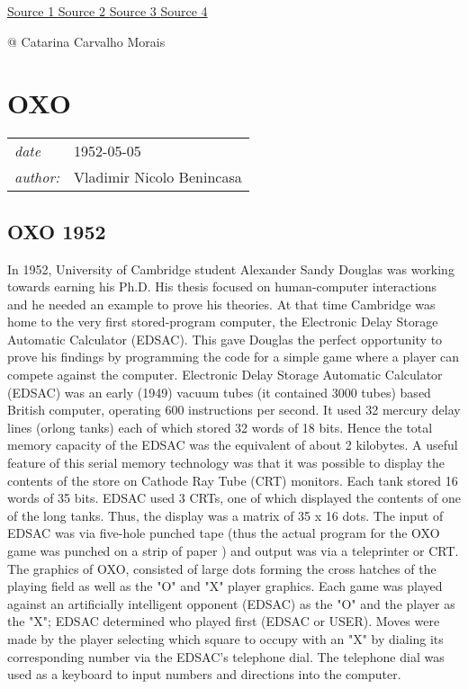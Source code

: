 \documentclass[a4paper,10pt]{book}
\newcommand{\pageHeader}[4]{
    \section{#1}
    \vspace{-0.3cm}
    \begin{table}[h!]
     \begin{tabular}{ll}
        \hline
        \textit{date} & #2 \\
        \textit{author: } & #3\\
        \hline
     \end{tabular}
    \end{table}
    \vspace{-0.3cm}
}
\begin{document}
 \href{https://en.wikipedia.org/wiki/Bertie_the_Brain}{Source 1 }
 \href{https://www.wikiwand.com/en/Bertie_the_Brain}{Source 2 }
 \href{http://spacing.ca/toronto/2014/08/13/meet-bertie-brain-worlds-first-arcade-game-built-toronto/}{Source 3 }
 \href{https://historyvgpodcast.wixsite.com/historyofvideogaming/games/bertie-the-brain}{Source 4 }
 
 
 
 @ Catarina Carvalho Morais 
 
 \newpage\pageHeader{OXO}{1952-05-05}{Vladimir Nicolo Benincasa}{Interactive visual game}
 \subsection{OXO 1952 }
 
          In 1952, University of Cambridge student Alexander Sandy Douglas was working towards earning his Ph.D. His thesis focused on human-computer interactions and he needed an example to prove his theories. At that time Cambridge was home to the very first stored-program computer, the Electronic Delay Storage Automatic Calculator (EDSAC). This gave Douglas the perfect opportunity to prove his findings by programming the code for a simple game where a player can compete against the computer.
Electronic Delay Storage Automatic Calculator (EDSAC) was an early (1949) vacuum tubes (it contained 3000 tubes) based British computer, operating 600 instructions per second. It used 32 mercury delay lines (orlong tanks) each of which stored 32 words of 18 bits. Hence the total memory capacity of the EDSAC was the equivalent of about 2 kilobytes. A useful feature of this serial memory technology was that it was possible to display the contents of the store on Cathode Ray Tube (CRT) monitors. Each tank stored 16 words of 35 bits. EDSAC used 3 CRTs, one of which displayed the contents of one of the long tanks. Thus, the display was a matrix of 35 x 16 dots.
The input of EDSAC was via five-hole punched tape (thus the actual program for the OXO game was punched on a strip of paper ) and output was via a teleprinter or CRT.
The graphics of OXO, consisted of large dots forming the cross hatches of the playing field as well as the "O" and "X" player graphics.
Each game was played against an artificially intelligent opponent (EDSAC) as the "O" and the player as the "X"; EDSAC determined who played first (EDSAC or USER).
Moves were made by the player selecting which square to occupy with an "X" by dialing its corresponding number via the EDSAC's telephone dial. The telephone dial was used as a keyboard to input numbers and directions into the computer.
\end{document}
